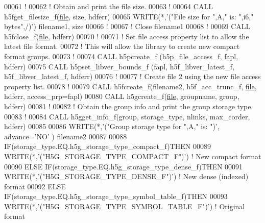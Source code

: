 \begin{DoxyCode}
00061   \textcolor{comment}{!}
00062   \textcolor{comment}{! Obtain and print the file size.}
00063   \textcolor{comment}{!}
00064   \textcolor{keyword}{CALL }h5fget\_filesize\_f(\hyperlink{structfile}{file}, \textcolor{keyword}{size}, hdferr)
00065   \textcolor{keyword}{WRITE}(*,\textcolor{stringliteral}{'("File size for ",A," is: ",i6," bytes",/)'}) filename1, \textcolor{keyword}{size}
00066   \textcolor{comment}{!}
00067   \textcolor{comment}{! Close filename1}
00068   \textcolor{comment}{!}
00069   \textcolor{keyword}{CALL }h5fclose\_f(\hyperlink{structfile}{file}, hdferr)
00070   \textcolor{comment}{!}
00071   \textcolor{comment}{! Set file access property list to allow the latest file format.}
00072   \textcolor{comment}{! This will allow the library to create new compact format groups.}
00073   \textcolor{comment}{!}
00074   \textcolor{keyword}{CALL }h5pcreate\_f (h5p\_file\_access\_f, fapl, hdferr)
00075   \textcolor{keyword}{CALL }h5pset\_libver\_bounds\_f (fapl, h5f\_libver\_latest\_f, h5f\_libver\_latest\_f, hdferr)
00076   \textcolor{comment}{!}
00077   \textcolor{comment}{! Create file 2 using the new file access property list.}
00078   \textcolor{comment}{!}
00079   \textcolor{keyword}{CALL }h5fcreate\_f(filename2, h5f\_acc\_trunc\_f, \hyperlink{structfile}{file}, hdferr, access\_prp=fapl)
00080   \textcolor{keyword}{CALL }h5gcreate\_f(\hyperlink{structfile}{file}, groupname, group, hdferr)
00081   \textcolor{comment}{!}
00082   \textcolor{comment}{! Obtain the group info and print the group storage type.}
00083   \textcolor{comment}{!}
00084   \textcolor{keyword}{CALL }h5gget\_info\_f(group, storage\_type, nlinks, max\_corder, hdferr)
00085 
00086   \textcolor{keyword}{WRITE}(*,\textcolor{stringliteral}{'("Group storage type for ",A," is: ")'}, advance=\textcolor{stringliteral}{'NO'} ) filename2
00087 
00088   \textcolor{keywordflow}{IF}(storage\_type.EQ.h5g\_storage\_type\_compact\_f)\textcolor{keywordflow}{THEN}
00089      \textcolor{keyword}{WRITE}(*,\textcolor{stringliteral}{'("H5G\_STORAGE\_TYPE\_COMPACT\_F")'}) \textcolor{comment}{! New compact format}
00090   \textcolor{keywordflow}{ELSE} \textcolor{keywordflow}{IF}(storage\_type.EQ.h5g\_storage\_type\_dense\_f)\textcolor{keywordflow}{THEN}
00091      \textcolor{keyword}{WRITE}(*,\textcolor{stringliteral}{'("H5G\_STORAGE\_TYPE\_DENSE\_F")'}) \textcolor{comment}{! New dense (indexed) format}
00092   \textcolor{keywordflow}{ELSE} \textcolor{keywordflow}{IF}(storage\_type.EQ.h5g\_storage\_type\_symbol\_table\_f)\textcolor{keywordflow}{THEN}
00093      \textcolor{keyword}{WRITE}(*,\textcolor{stringliteral}{'("H5G\_STORAGE\_TYPE\_SYMBOL\_TABLE\_F")'}) \textcolor{comment}{! Original format}

\end{DoxyCode}
